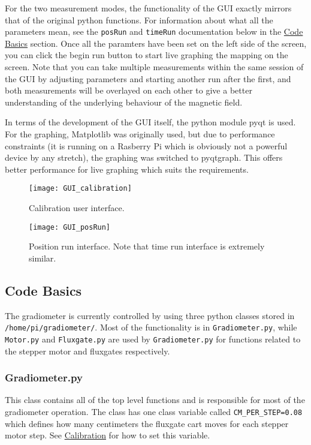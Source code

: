 \documentclass{TheMartianReport}
\newcommand{\pyinline}[1]{\texttt{#1}}
\newcommand{\shellinline}[1]{\texttt{#1}}
\begin{document}
For the two measurement modes, the functionality of the GUI exactly mirrors that of the original python functions. For information about what all the parameters mean, see the \pyinline{posRun} and \pyinline{timeRun} documentation below in the \hyperref[subsec:CodeBasics]{Code Basics} section. Once all the paramters have been set on the left side of the screen, you can click the begin run button to start live graphing the mapping on the screen. Note that you can take multiple measurements within the same session of the GUI by adjusting parameters and starting another run after the first, and both measurements will be overlayed on each other to give a better understanding of the underlying behaviour of the magnetic field. 

In terms of the development of the GUI itself, the python module pyqt is used. For the graphing, Matplotlib was originally used, but due to performance constraints (it is running on a Rasberry Pi which is obviously not a powerful device by any stretch), the graphing was switched to pyqtgraph. This offers better performance for live graphing which suits the requirements. 

\begin{figure}[h]
	\centering
	\texttt{[image: GUI\_calibration]}
	\caption{Calibration user interface.}
	\label{fig:PSUpinouts}
\end{figure}

\begin{figure}[h]
	\centering
	\texttt{[image: GUI\_posRun]}
	\caption{Position run interface. Note that time run interface is extremely similar.}
	\label{fig:PSUpinouts}
\end{figure}

\subsection{Code Basics} \label{subsec:CodeBasics}
The gradiometer is currently controlled by using three python classes stored in \shellinline{/home/pi/gradiometer/}. Most of the functionality is in \shellinline{Gradiometer.py}, while \shellinline{Motor.py} and \shellinline{Fluxgate.py} are used by \shellinline{Gradiometer.py} for functions related to the stepper motor and fluxgates respectively.

\subsubsection{Gradiometer.py}
This class contains all of the top level functions and is responsible for most of the gradiometer operation. The class has one class variable called \pyinline{CM_PER_STEP=0.08} which defines how many centimeters the fluxgate cart moves for each stepper motor step. See \hyperref[subsec:Calibration]{Calibration} for how to set this variable.
\end{document}
